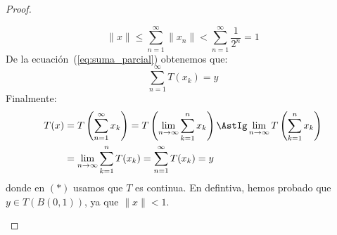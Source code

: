 \begin{teo}
\begin{proof}
\begin{description}
                \begin{equation*}
                    \|x\| \leq \sum_{n=1}^{\infty}\|x_n\| < \sum_{n=1}^{\infty}\frac{1}{2^n} =1
                \end{equation*}
                De la ecuación~(\ref{eq:suma_parcial}) obtenemos que:
                \begin{equation*}
                    \sum_{n=1}^{\infty}T(x_k) = y
                \end{equation*}
                Finalmente:
                \begin{align*}
                    T(x) &= T\left(\sum_{n=1}^{\infty}x_k\right) = T\left(\lim_{n\to\infty}\sum_{k=1}^{n}x_k\right) \AstIg \lim_{n\to\infty}T\left(\sum_{k=1}^{n}x_k\right) \\ &= \lim_{n\to\infty}\sum_{k=1}^{n}T(x_k) = \sum_{n=1}^{\infty}T(x_k)  = y
                \end{align*}
                donde en $(\ast)$ usamos que $T$ es continua. En defintiva, hemos probado que $y\in T(B(0,1))$, ya que $\|x\| < 1$.
        \end{description}
    \end{proof}
\end{teo}

